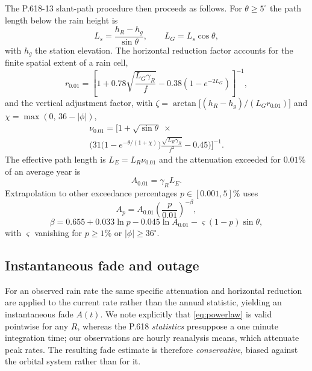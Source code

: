 \documentclass[10pt,twocolumn]{article}
\begin{document}
The P.618-13 slant-path procedure then proceeds as follows. For
$\theta\ge5^{\circ}$ the path length below the rain height is
\begin{equation}
L_{s}=\frac{h_{R}-h_{g}}{\sin\theta},\qquad L_{G}=L_{s}\cos\theta,
\end{equation}
with $h_{g}$ the station elevation. The horizontal reduction factor accounts for
the finite spatial extent of a rain cell,
\begin{equation}
r_{0.01}=\left[1+0.78\sqrt{\frac{L_{G}\gamma_{R}}{f}}
-0.38\left(1-e^{-2L_{G}}\right)\right]^{-1},
\label{eq:hred}
\end{equation}
and the vertical adjustment factor, with
$\zeta=\arctan\!\big[(h_{R}-h_{g})/(L_{G}r_{0.01})\big]$ and
$\chi=\max(0,\,36-|\phi|)$,
\begin{equation}
\begin{split}
\nu_{0.01}=\Bigg[1+\sqrt{\sin\theta}\;\times \\
\Bigg(31\big(1-e^{-\theta/(1+\chi)}\big)
\frac{\sqrt{L_{R}\gamma_{R}}}{f^{2}}-0.45\Bigg)\Bigg]^{-1}.
\end{split}
\end{equation}
The effective path length is $L_{E}=L_{R}\nu_{0.01}$ and the attenuation
exceeded for $0.01\%$ of an average year is
\begin{equation}
A_{0.01}=\gamma_{R}L_{E}.
\end{equation}
Extrapolation to other exceedance percentages $p\in[0.001,5]\%$ uses
\begin{equation}
A_{p}=A_{0.01}\left(\frac{p}{0.01}\right)^{-\beta},
\end{equation}
\begin{equation}
\beta = 0.655+0.033\ln p-0.045\ln A_{0.01}-\varsigma(1-p)\sin\theta,
\end{equation}
with $\varsigma$ vanishing for $p\ge1\%$ or $|\phi|\ge36^{\circ}$.

\subsection{Instantaneous fade and outage}

For an observed rain rate the same specific attenuation and horizontal reduction
are applied to the current rate rather than the annual statistic, yielding an
instantaneous fade $A(t)$. We note explicitly that \eqref{eq:powerlaw} is valid
pointwise for any $R$, whereas the P.618 \emph{statistics} presuppose a one
minute integration time; our observations are hourly reanalysis means, which
attenuate peak rates. The resulting fade estimate is therefore
\emph{conservative}, biased against the orbital system rather than for it.
\end{document}

